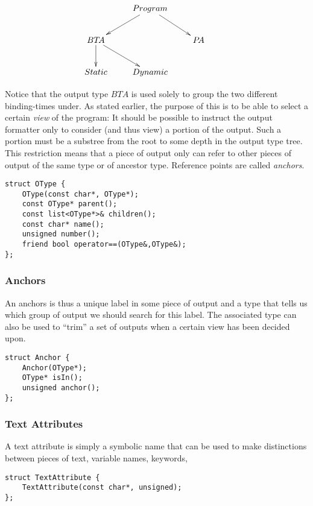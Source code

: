 \begin{docpart}
\[
\xymatrix{
  & Program \ar[ld] \ar[rd] & & \\
  BT\!A \ar[d] \ar[rd] & & P\!A \\
  Static & Dynamic & \\
}
\]

\noindent
Notice that the output type $BT\!A$ is used solely to group the two
different binding-times under. As stated earlier, the purpose of this
is to be able to select a certain \emph{view} of the program: It
should be possible to instruct the output formatter only to consider
(and thus view) a portion of the output. Such a portion must be a
substree from the root to some depth in the output type tree. This
restriction means that a piece of output only can refer to other
pieces of output of the same type or of ancestor type. Reference
points are called \emph{anchors}.

\begin{verbatim}
struct OType {
    OType(const char*, OType*);
    const OType* parent();
    const list<OType*>& children();
    const char* name();
    unsigned number();
    friend bool operator==(OType&,OType&);
};

\end{verbatim}

\subsubsection{Anchors}
\label{sec:anchors}
An anchors is thus a unique label in some piece of output and a type
that tells us which group of output we should search for this
label. The associated type can also be used to ``trim'' a set of
outputs when a certain view has been decided upon.

\begin{verbatim}
struct Anchor {
    Anchor(OType*);
    OType* isIn();
    unsigned anchor();
};
\end{verbatim}

\subsubsection{Text Attributes}
\label{sec:textattribute}
A text attribute is simply a symbolic name that can be used to make
distinctions between pieces of text, \eg variable names, keywords,
\etc

\begin{verbatim}
struct TextAttribute {
    TextAttribute(const char*, unsigned);
};
\end{verbatim}


\end{docpart}
